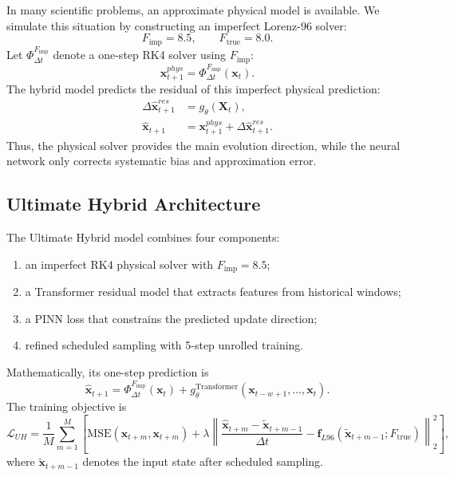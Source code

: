 \documentclass[a4paper,12pt]{article}
\newcommand{\xvec}{\mathbf{x}}
\newcommand{\dt}{\Delta t}
\newcommand{\mse}{\mathrm{MSE}}
\begin{document}
In many scientific problems, an approximate physical model is available. We simulate this situation by constructing an imperfect Lorenz-96 solver:
\begin{equation}
F_{\mathrm{imp}}=8.5,\qquad F_{\mathrm{true}}=8.0.
\end{equation}
Let $\Phi_{\dt}^{F_{\mathrm{imp}}}$ denote a one-step RK4 solver using $F_{\mathrm{imp}}$:
\begin{equation}
\xvec^{phys}_{t+1}=\Phi_{\dt}^{F_{\mathrm{imp}}}(\xvec_t).
\end{equation}
The hybrid model predicts the residual of this imperfect physical prediction:
\begin{align}
\Delta \hat{\xvec}^{res}_{t+1} &= g_\theta(\mathbf{X}_t),\\
\hat{\xvec}_{t+1} &= \xvec^{phys}_{t+1}+\Delta \hat{\xvec}^{res}_{t+1}.
\end{align}
Thus, the physical solver provides the main evolution direction, while the neural network only corrects systematic bias and approximation error.

\subsection{Ultimate Hybrid Architecture}

The Ultimate Hybrid model combines four components:
\begin{enumerate}
    \item an imperfect RK4 physical solver with $F_{\mathrm{imp}}=8.5$;
    \item a Transformer residual model that extracts features from historical windows;
    \item a PINN loss that constrains the predicted update direction;
    \item refined scheduled sampling with 5-step unrolled training.
\end{enumerate}
Mathematically, its one-step prediction is
\begin{equation}
\hat{\xvec}_{t+1}
=
\Phi_{\dt}^{F_{\mathrm{imp}}}(\xvec_t)
+
g_{\theta}^{\mathrm{Transformer}}(\xvec_{t-w+1},\dots,\xvec_t).
\end{equation}
The training objective is
\begin{equation}
\mathcal{L}_{UH}
=
\frac{1}{M}\sum_{m=1}^{M}
\left[
\mse(\hat{\xvec}_{t+m},\xvec_{t+m})
+
\lambda
\left\|
\frac{\hat{\xvec}_{t+m}-\tilde{\xvec}_{t+m-1}}{\dt}
-
\mathbf{f}_{L96}(\tilde{\xvec}_{t+m-1};F_{\mathrm{true}})
\right\|_2^2
\right],
\end{equation}
where $\tilde{\xvec}_{t+m-1}$ denotes the input state after scheduled sampling.
\end{document}
